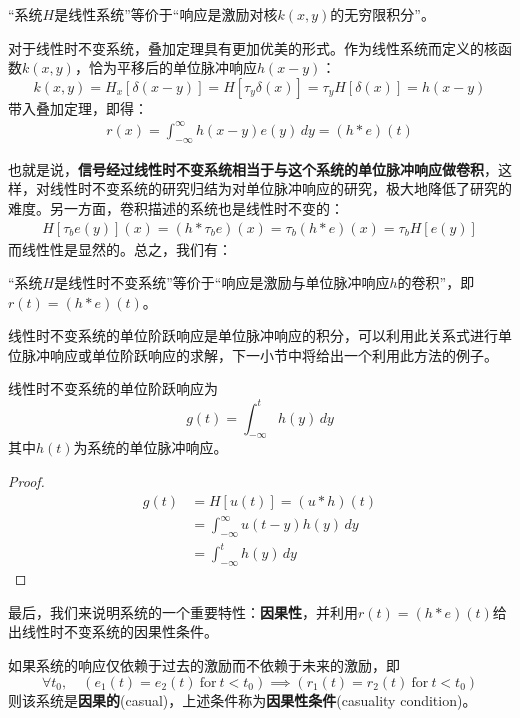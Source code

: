 \begin{proposition}[线性系统的等价定义]
    “系统$H$是线性系统”等价于“响应是激励对核$k(x,y)$的无穷限积分”。
\end{proposition}

对于线性时不变系统，叠加定理具有更加优美的形式。作为线性系统而定义的核函数$k(x,y)$，恰为平移后的单位脉冲响应$h(x-y)$：
\[k(x,y)=H_x[\delta(x-y)]=H[\tau_y\delta(x)]=\tau_y H[\delta(x)]=h(x-y)\]
带入叠加定理，即得：
\begin{align*}
    r(x)=\int_{-\infty}^{\infty}h(x-y)e(y)\,dy=(h*e)(t)
\end{align*}

也就是说，\textbf{信号经过线性时不变系统相当于与这个系统的单位脉冲响应做卷积}，这样，对线性时不变系统的研究归结为对单位脉冲响应的研究，极大地降低了研究的难度。另一方面，卷积描述的系统也是线性时不变的：\begin{align*}
    H[\tau_b e(y)](x)=(h*\tau_b e)(x)=\tau_b(h*e)(x)=\tau_b H[e(y)]
\end{align*}
而线性性是显然的。总之，我们有：
\begin{proposition}[线性时不变系统的等价定义]
    \label{prop:LTI_conv}
    “系统$H$是线性时不变系统”等价于“响应是激励与单位脉冲响应$h$的卷积”，即$r(t)=(h*e)(t)$。
\end{proposition}

线性时不变系统的单位阶跃响应是单位脉冲响应的积分，可以利用此关系式进行单位脉冲响应或单位阶跃响应的求解，下一小节中将给出一个利用此方法的例子。

\begin{proposition}[单位阶跃响应]
    \label{prop:step_response}
    线性时不变系统的单位阶跃响应为
    $$g(t)=\int_{-\infty}^{t}h(y)\,dy$$
    其中$h(t)$为系统的单位脉冲响应。
\end{proposition}
\begin{proof}
\begin{align*}
    g(t)&=H[u(t)]=(u*h)(t)\\
    &=\int_{-\infty}^{\infty}u(t-y)h(y)\,dy\\
    &=\int_{-\infty}^{t}h(y)\,dy
\end{align*}
\end{proof}

最后，我们来说明系统的一个重要特性：\textbf{因果性}，并利用$r(t)=(h*e)(t)$给出线性时不变系统的因果性条件。

\begin{definition}[因果性]
    \label{def:causuality}
    如果系统的响应仅依赖于过去的激励而不依赖于未来的激励，即
    \begin{equation}
        \forall t_0,\quad \left(e_1(t)=e_2(t)\ \mathrm{for}\ t<t_0\right)\implies \left(r_1(t)=r_2(t)\ \mathrm{for}\ t<t_0\right)\label{eq:4.1}
    \end{equation}
    则该系统是\textbf{因果的}(casual)，上述条件称为\textbf{因果性条件}(casuality condition)。
\end{definition}

